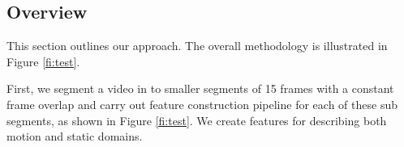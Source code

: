 
\subsection{Overview}

This section outlines our approach. The overall methodology is illustrated in Figure \ref{fi:test}.



\begin{figure*}
  \centering
  
  \caption{\textbf{Overall methodology}. The whole process consists of five major steps: (i) segmenting a video (ii) crafting static features, (iii) crafting motion features,
  (iv) fusing static and motion features, and (v) capturing temporal evolution of sub events. Static and motion features are independent
  and complementary. We generate static and motion features based on a pre-trained CNN and
  motion tubes respectively, and capture the temporal evolution of sub events using a LSTM network.}

 \label{fi:test}
\end{figure*}


First, we segment a video in to smaller segments of 15 frames with a constant frame overlap
and carry out feature construction pipeline for each of these sub segments, as shown in Figure \ref{fi:test}.
We create features for describing both motion and static domains.

